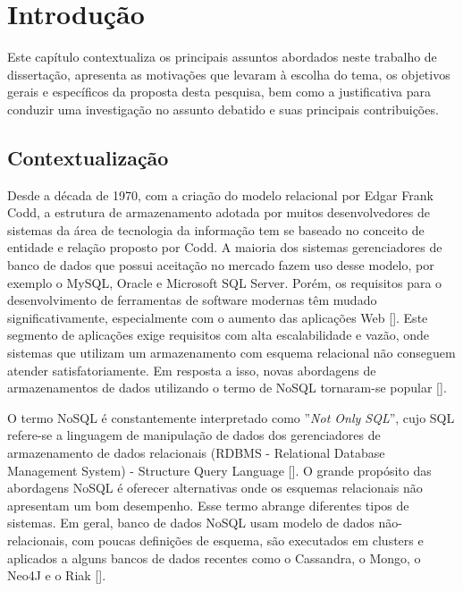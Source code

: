 
\chapter{Introdução}
\label{chp:introduction}


\noindent Este capítulo contextualiza os principais assuntos abordados neste trabalho de dissertação, apresenta as motivações que levaram à escolha do tema, os objetivos gerais e específicos da proposta desta pesquisa, bem como a justificativa para conduzir uma investigação no assunto debatido e suas principais contribuições.
\clearpage


\section{Contextualização}

Desde a década de 1970, com a criação do modelo relacional por Edgar Frank Codd, a estrutura de armazenamento adotada por muitos desenvolvedores de sistemas da área de tecnologia da informação tem se baseado no conceito de entidade e relação proposto por Codd. A maioria dos sistemas gerenciadores de banco de dados que possui aceitação no mercado fazem uso desse modelo, por exemplo o MySQL, Oracle e Microsoft SQL Server. Porém, os requisitos para o desenvolvimento de ferramentas de software modernas têm mudado significativamente, especialmente com o aumento das aplicações Web [\cite{nasholm:2012}]. Este segmento de aplicações exige requisitos com alta escalabilidade e vazão, onde sistemas que utilizam um armazenamento com esquema relacional não conseguem atender satisfatoriamente. Em resposta a isso, novas abordagens de armazenamentos de dados utilizando o termo de NoSQL tornaram-se popular [\cite{silva:2016}].

O termo NoSQL é constantemente interpretado como  ''\emph{Not Only SQL}'', cujo SQL refere-se a linguagem de manipulação de dados dos gerenciadores de armazenamento de dados relacionais (RDBMS - Relational Database Management System) - Structure Query Language [\cite{nasholm:2012}]. O grande propósito das abordagens NoSQL é oferecer alternativas onde os esquemas relacionais não apresentam um bom desempenho. Esse termo abrange diferentes tipos de sistemas. Em geral, banco de dados NoSQL usam modelo de dados não-relacionais, com poucas definições de esquema, são executados em clusters e aplicados a alguns bancos de dados recentes como o Cassandra, o Mongo, o Neo4J e o Riak [\cite{fowler:2013}].

